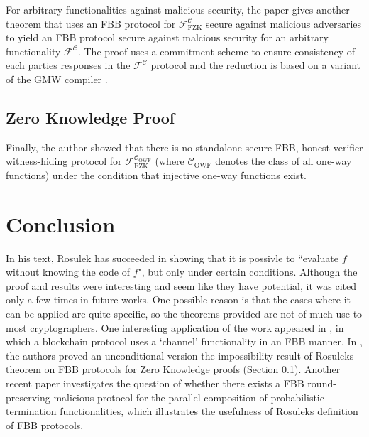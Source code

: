 \documentclass[11pt]{article}
\theoremstyle{theorem}
\theoremstyle{theorem}
\theoremstyle{remark}
\theoremstyle{note}
\theoremstyle{plain}
\theoremstyle{definition}
\begin{document}
For arbitrary functionalities against malicious security, the paper gives another theorem that uses an FBB protocol for $\mathcal{F}^\mathcal{C}_\text{FZK}$ secure against malicious adversaries to yield an FBB protocol secure against malcious security for an arbitrary functionality $\mathcal{F}^\mathcal{C}$. The proof uses a commitment scheme to ensure consistency of each parties responses in the $\mathcal{F}^\mathcal{C}$ protocol and the reduction is based on a variant of the GMW compiler \cite{STOC:GolMicWig87}.

\subsection{Zero Knowledge Proof} \label{section-zk}
Finally, the author showed that there is no standalone-secure FBB, honest-verifier witness-hiding protocol for $\mathcal{F}^{\mathcal{C}_\text{OWF}}_\text{FZK}$ (where $\mathcal{C}_\text{OWF}$ denotes the class of all one-way functions) under the condition that injective one-way functions exist.

\section{Conclusion}
In his text, Rosulek has succeeded in showing that it is possivle to ``evaluate $f$ without knowing the code of $f$", but only under certain conditions. Although the proof and results were interesting and seem like they have potential, it was cited only a few times in future works. One possible reason is that the cases where it can be applied are quite specific, so the theorems provided are not of much use to most cryptographers. One interesting application of the work appeared in \cite{C:BMTZ17}, in which a blockchain protocol uses a `channel' functionality in an FBB manner. In \cite{C:IKPSY16}, the authors proved an unconditional version the impossibility result of Rosuleks theorem on FBB protocols for Zero Knowledge proofs (Section \ref{section-zk}). Another recent paper \cite{ICALP:CCGZ17} investigates the question of whether there exists a FBB round-preserving malicious protocol for the parallel composition of probabilistic-termination functionalities, which illustrates the usefulness of Rosuleks definition of FBB protocols.




\end{document}
